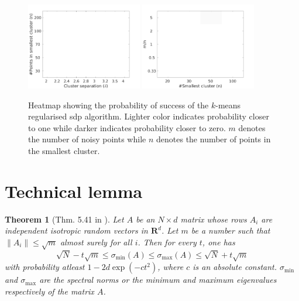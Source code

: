 \documentclass[12pt]{article}
\newcommand{\mb}{\mathbf}
\newtheorem{theorem}{Theorem}
\begin{document}
\begin{figure}
  \includegraphics[width=0.45\textwidth]{figures/optimizationClustering/deltan.png}
  \includegraphics[width=0.45\textwidth]{figures/optimizationClustering/nM.png}
  \caption{Heatmap showing the probability of success of the $k$-means regularised sdp algorithm. Lighter color indicates probability closer to one while darker indicates probability closer to zero. $m$ denotes the number of noisy points while $n$ denotes the number of points in the smallest cluster.}  
\end{figure}

\section{Technical lemma}
\begin{theorem}[Thm. 5.41 in \cite{vershynin2010introduction}]
\label{a-thm:spectralNormCOncentration}
Let $A$ be an $N\times d$ matrix whose rows $A_i$ are independent isotropic random vectors in $\mb R^d$. Let $m$ be a number such that $\|A_i\| \le \sqrt{m}$ almost surely for all $i$. Then for every $t$, one has
$$\sqrt{N} - t\sqrt{m} \le \sigma_{\min}(A) \le \sigma_{\max}(A) \le \sqrt{N} + t\sqrt{m}$$
with probability atleast $1-2d\exp(-ct^2)$, where $c$ is an absolute constant. $\sigma_{\min}$ and $\sigma_{\max}$ are the spectral norms or the minimum and maximum eigenvalues respectively of the matrix $A$.
\end{theorem}

\ifdefined\COMPLETE
\else
\end{document}
